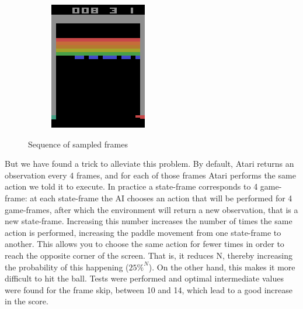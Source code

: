 \begin{figure}
\begin{subfigure}[h]{0.19\linewidth}
\includegraphics[width=\linewidth]{images/frame-sequence-4.png}
\end{subfigure}
\caption{Sequence of sampled frames}
\end{figure}

But we have found a trick to alleviate this problem. By default, Atari returns
an observation every 4 frames, and for each of those frames Atari performs the
same action we told it to execute. In practice a state-frame corresponds to 4
game-frame: at each state-frame the AI chooses an action that will be performed
for 4 game-frames, after which the environment will return a new observation,
that is a new state-frame. Increasing this number increases the number of times
the same action is performed, increasing the paddle movement from one
state-frame to another. This allows you to choose the same action for fewer
times in order to reach the opposite corner of the screen. That is, it
reduces N, thereby increasing the probability of this happening ($25\%^{N}$).
On the other hand, this makes it more difficult to hit the ball. Tests were
performed and optimal intermediate values were found for the frame skip,
between 10 and 14, which lead to a good increase in the score.

